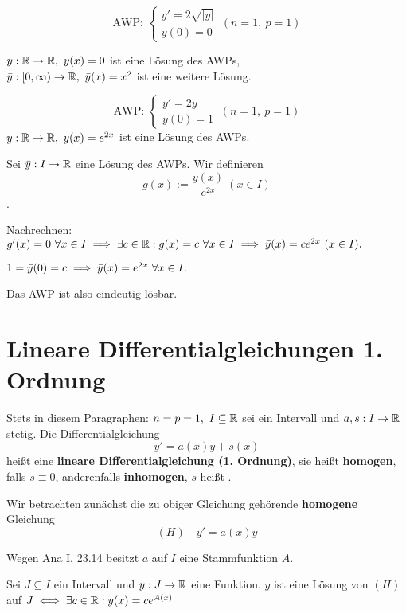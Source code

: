 \documentclass[a4paper,twoside,DIV15,BCOR12mm]{scrbook}
\begin{document}
\begin{beispiele}
\item $$\text{AWP: }\begin{cases}y'=2\sqrt{|y|}\\ y(0)=0\end{cases}\ (n=1,\ p=1)$$

$y:\mathbb{R}\to\mathbb{R},\ y(x)=0$ ist eine Lösung des AWPs,\\
$\bar{y}:[0,\infty)\to\MdR,\ \bar{y}(x)=x^2$ ist eine weitere Lösung.

\item $$\text{AWP: }\begin{cases}y'=2y\\ y(0)=1\end{cases}\ (n=1,\ p=1)$$
$y:\mathbb{R}\to\mathbb{R},\ y(x)=e^{2x}$ ist eine Lösung des AWPs.

Sei $\bar{y}:I\to\mathbb{R}$ eine Lösung des AWPs. Wir definieren $$g(x) := \frac{\bar{y}(x)}{e^{2x}}\ (x\in I)$$.

Nachrechnen: $g'(x)=0\ \forall x\in I \implies \exists c\in\mathbb{R}:g(x)=c\ \forall x\in I \implies \bar{y}(x) = ce^{2x}\ (x\in I).$

$1=\bar{y}(0)=c \folgt \bar{y}(x)=e^{2x}\ \forall x\in I.$

Das AWP ist also eindeutig lösbar.
\end{beispiele}

\chapter{Lineare Differentialgleichungen 1. Ordnung}


Stets in diesem Paragraphen: $n=p=1,\ I\subseteq \MdR$ sei ein Intervall und $a,s:I\to\mathbb{R}$ stetig. Die Differentialgleichung $$y'=a(x)y+s(x)$$ heißt eine \textbf{lineare Differentialgleichung (1. Ordnung)}, sie heißt \textbf{homogen}, falls $s\equiv 0$, anderenfalls \textbf{inhomogen}, $s$ heißt .

Wir betrachten zunächst die zu obiger Gleichung gehörende \textbf{homogene} Gleichung $$(H)\quad y'=a(x)y$$

Wegen Ana I, 23.14 besitzt $a$ auf $I$ eine Stammfunktion $A$.

\begin{satz}
Sei $J\subseteq I$ ein Intervall und $y:J\to\mathbb{R}$ eine Funktion. $y$ ist eine Lösung von $(H)$ auf $J \iff \exists c\in\mathbb{R}:y(x)=ce^{A(x)}$
\end{satz}
\end{document}
